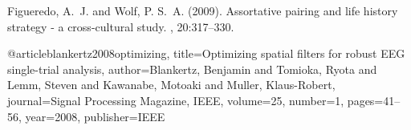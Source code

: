\begin{thebibliography}{99} %

Figueredo, A.~J. and Wolf, P. S.~A. (2009).
\newblock Assortative pairing and life history strategy - a cross-cultural
  study.
, 20:317--330.
 
@article{blankertz2008optimizing,
	title={Optimizing spatial filters for robust EEG single-trial analysis},
	author={Blankertz, Benjamin and Tomioka, Ryota and Lemm, Steven and Kawanabe, Motoaki and Muller, Klaus-Robert},
	journal={Signal Processing Magazine, IEEE},
	volume={25},
	number={1},
	pages={41--56},
	year={2008},
	publisher={IEEE}
}
\end{thebibliography}